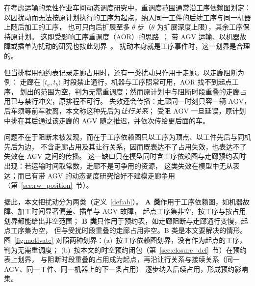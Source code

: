 \documentclass[manuscript,screen,review]{acmart}
\begin{document}
在考虑运输的柔性作业车间动态调度研究中，重调度范围通常沿工序依赖图划定：
以因扰动而无法按原计划执行的工序为起点，纳入同一工件的后续工序与同一机器上随后加工的工序，
也可只向后扩展至多 \(\theta\) 步（\(\theta\) 为扩展深度上限），其余工序保持原计划。
这即受影响工序重调度（AOR）的思路~\cite{subramaniam2003maor}；
带 AGV 运输、以机器故障或插单为扰动的研究也按此划界~\cite{zhang2023energy,tang2026dynamic}。
扰动本身就是工序事件时，这一划界是合理的。

但当排程用预约表记录走廊占用时，还有一类扰动只作用于走廊。以走廊阻断为例：
走廊在 \([t_a,t_b)\) 时段禁止通行，机器与工序照常可用，AOR 找不到起点工序，
划出的范围为空，判为无需重调度；然而原计划中与阻断时段重叠的走廊占用已与禁行冲突，原排程不可行。
失效还会传播：走廊同一时刻只容一辆 AGV，后车须等前车驶离，本文称这种先后为\emph{让行关系}；
受阻 AGV 一旦延误，原计划中排在其后通过该走廊的 AGV 随之推迟，并依次传给更后面的车。

问题不在于阻断未被发现，而在于工序依赖图只以工序为顶点、以工件先后与同机先后为边，
不含走廊占用及其让行关系，因而既表达不了占用失效，也表达不了失效在 AGV 之间的传播。
这一缺口只在模型同时含工序依赖图与走廊预约表时出现：若运输时间取常数，走廊不是可争用的资源，
这类失效在模型中无从表达；而已有带 AGV 的动态调度研究恰好不建模走廊争用（第~\ref{sec:rw_position}~节）。

据此，本文把扰动分为两类（定义~\ref{def:ab}）。
\textbf{A 类}作用于工序依赖图，如机器故障、加工时间显著偏差、插单与 AGV 故障，
起点工序集非空，按工序与按占用划界都能给出非空范围；
\textbf{B 类}只作用于预约表，如走廊阻断与走廊通行变慢，起点工序集为空，
但与受扰时段重叠的走廊占用非空。B 类是本文要解决的情形。
图~\ref{fig:motivate} 对照两种划界：(a)~按工序依赖图划界，没有作为起点的工序，判为无需重调度；
(b)~按本文的时空预约闭包（第~\ref{sec:closure_def}~节）在预约表上划界，
与阻断时段重叠的占用成为起点，再沿让行关系与接续关系（同一 AGV、同一工件、同一机器上的下一条占用）
逐步纳入后续占用，形成预约影响集。
\end{document}
